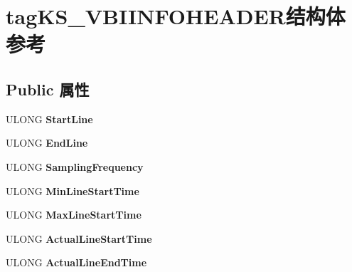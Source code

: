 \hypertarget{structtag_k_s___v_b_i_i_n_f_o_h_e_a_d_e_r}{}\section{tag\+K\+S\+\_\+\+V\+B\+I\+I\+N\+F\+O\+H\+E\+A\+D\+E\+R结构体 参考}
\label{structtag_k_s___v_b_i_i_n_f_o_h_e_a_d_e_r}
\subsection*{Public 属性}
\begin{DoxyCompactItemize}
\item 
\mbox{\label{structtag_k_s___v_b_i_i_n_f_o_h_e_a_d_e_r_af944118b4715d3a932fb00f199495b31}} 
U\+L\+O\+NG {\bfseries Start\+Line}
\item 
\mbox{\label{structtag_k_s___v_b_i_i_n_f_o_h_e_a_d_e_r_ac546cc2a670fbb4b6c83ed291c12d9e7}} 
U\+L\+O\+NG {\bfseries End\+Line}
\item 
\mbox{\label{structtag_k_s___v_b_i_i_n_f_o_h_e_a_d_e_r_a8f1ace45447e433f0cce883493558c8e}} 
U\+L\+O\+NG {\bfseries Sampling\+Frequency}
\item 
\mbox{\label{structtag_k_s___v_b_i_i_n_f_o_h_e_a_d_e_r_ad9c99dea90e7f88be48f620cd61365be}} 
U\+L\+O\+NG {\bfseries Min\+Line\+Start\+Time}
\item 
\mbox{\label{structtag_k_s___v_b_i_i_n_f_o_h_e_a_d_e_r_a2391a3ef4b936af918bb84c299f3e3b3}} 
U\+L\+O\+NG {\bfseries Max\+Line\+Start\+Time}
\item 
\mbox{\label{structtag_k_s___v_b_i_i_n_f_o_h_e_a_d_e_r_addceacbfaa333ad99a6b6fd27ecf0f0e}} 
U\+L\+O\+NG {\bfseries Actual\+Line\+Start\+Time}
\item 
\mbox{\label{structtag_k_s___v_b_i_i_n_f_o_h_e_a_d_e_r_acec9198677f2a1324dc3a4663f3fa416}} 
U\+L\+O\+NG {\bfseries Actual\+Line\+End\+Time}

\end{DoxyCompactItemize}
